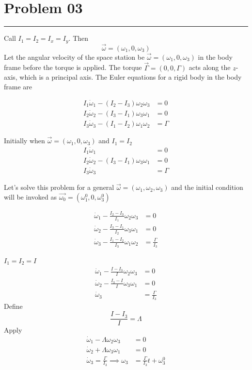 \documentclass[letter, 10pts]{article}
\begin{document}
\newpage
\section*{Problem 03}
\hrule 


Call $I_1 = I_2 = I_x = I_y$. Then
\[
\vec{\omega} = (\omega_1 , 0 , \omega_3)
\] 
Let the angular velocity of the space station be \( \vec{\omega} = (\omega_1, 0, \omega_3) \) in the body frame before the torque is applied. The torque \( \vec{\Gamma} = (0, 0, \Gamma) \) acts along the \( z \)-axis, which is a principal axis. The Euler equations for a rigid body in the body frame are

\[
\begin{aligned}
I_1 \dot{\omega}_1 - (I_2 - I_3) \omega_2 \omega_3 &= 0 \\
I_2 \dot{\omega}_2 - (I_3 - I_1) \omega_3 \omega_1 &= 0 \\
I_3 \dot{\omega}_3 - (I_1 - I_2) \omega_1 \omega_2 &= \Gamma
\end{aligned}
\]

Initially when $\vec{\omega} = (\omega_1, 0, \omega_3)$ and $I_1 = I_2$
\[
\begin{aligned}
I_1 \dot{\omega}_1 &= 0 \\
I_2 \dot{\omega}_2 - (I_3 - I_1) \omega_3 \omega_1 &= 0 \\
I_3 \dot{\omega}_3  &= \Gamma
\end{aligned}
\]








Let's solve this problem for a general $\vec{\omega} = (\omega_1, \omega_2, \omega_3)$ and the initial condition will be invoked as $\vec{\omega_0} =( \omega^{0}_1, 0 , \omega^{0}_3 )$

\[
\begin{aligned}
\dot{\omega}_1 - \frac{I_2 - I_3}{I_1} \omega_2 \omega_3 &= 0 \\
 \dot{\omega}_2 - \frac{I_3 - I_1}{I_2} \omega_3 \omega_1 &= 0 \\
 \dot{\omega}_3 - \frac{I_1 - I_2}{I_3} \omega_1 \omega_2 &= \frac{\Gamma}{I_3}
\end{aligned}
\]

$I_1 = I_2 = I$ 
\[
\begin{aligned}
\dot{\omega}_1 - \frac{I - I_3}{I} \omega_2 \omega_3 &= 0 \\
 \dot{\omega}_2 - \frac{I_3 - I}{I} \omega_3 \omega_1 &= 0 \\
 \dot{\omega}_3  &= \frac{\Gamma}{I_3}
\end{aligned}
\]
Define
\[
 \frac{I - I_3}{I}  = \Lambda
\] 
Apply 
\[
\begin{aligned}
\dot{\omega}_1 - \Lambda \omega_2 \omega_3 &= 0 \\
 \dot{\omega}_2 + \Lambda  \omega_3 \omega_1 &= 0 \\
 \dot{\omega}_3  = \frac{\Gamma}{I_3} \implies \omega_3 &= \frac{\Gamma}{I_3} t + \omega^{0}_3
\end{aligned}
\]
\end{document}
